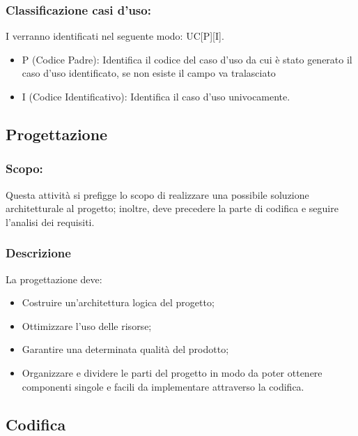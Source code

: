 \documentclass[../NomeDocumento.tex]{subfiles}
\begin{document}
	\subsubsection{Classificazione casi d’uso:} 
	
	I  verranno identificati nel seguente modo: UC[P][I].
	
	\begin{itemize}
		\item P (Codice Padre): Identifica il codice del caso d'uso da cui è stato generato il caso d'uso identificato, se non esiste il campo va tralasciato
		\item I (Codice Identificativo): Identifica il caso d'uso univocamente.
	\end{itemize}
	
\subsection{Progettazione} 

	\subsubsection{Scopo:} 

	Questa attività si prefigge lo scopo di realizzare una possibile soluzione architetturale al progetto; inoltre, deve precedere la parte di codifica e seguire l’analisi dei requisiti.
	
	\subsubsection{Descrizione}
	
	La progettazione deve:
	
	\begin{itemize}
		\item Costruire un’architettura logica del progetto;
		\item Ottimizzare l’uso delle risorse;
		\item Garantire una determinata qualità del prodotto;
		\item Organizzare e dividere le parti del progetto in modo da poter ottenere componenti singole e facili da implementare attraverso la codifica. 
	\end{itemize}
	
	\subsection{Codifica}
	
\end{document}
